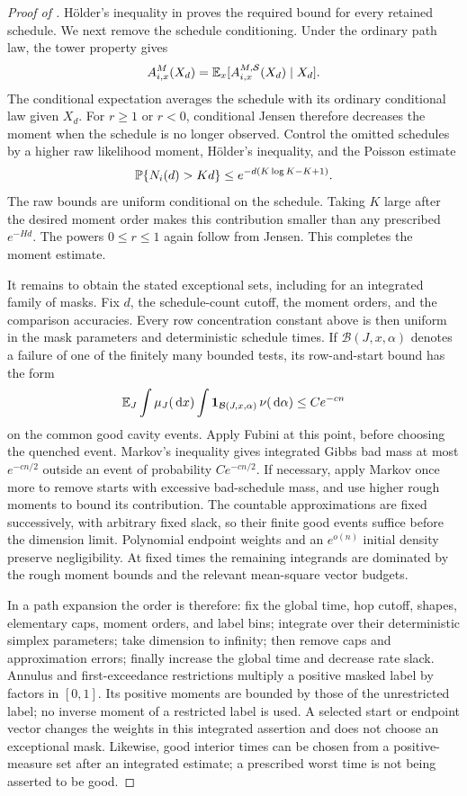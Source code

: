 \begin{proof}[Proof of ]
H\"older's inequality in  proves the required
bound for every retained schedule. We next remove the schedule
conditioning. Under the ordinary path law, the tower property gives
\[
 A_{i,x}^M(X_d)
 =\E_x[A_{i,x}^{M,\mathcal S}(X_d)\mid X_d].
\]
The conditional expectation averages the schedule with its ordinary
conditional law given $X_d$. For $r\ge1$ or $r<0$, conditional Jensen
therefore decreases the moment when the schedule is no longer observed.  Control
the omitted schedules by a higher raw likelihood moment, H\"older's
inequality, and the Poisson estimate
\[
 \P\{N_i(d)>Kd\}\le e^{-d(K\log K-K+1)}.
\]
The raw bounds are uniform conditional on the schedule.  Taking $K$
large after the desired moment order makes this contribution smaller
than any prescribed $e^{-Hd}$.  The powers $0\le r\le1$ again follow
from Jensen.  This completes the moment estimate.

It remains to obtain the stated exceptional sets, including for an
integrated family of masks.  Fix $d$, the schedule-count cutoff, the
moment orders, and the comparison accuracies.  Every row concentration
constant above is then uniform in the mask parameters and deterministic
schedule times.  If
$\mathcal B(J,x,\alpha)$ denotes a failure of one of the finitely many
bounded tests, its row-and-start bound has the form
\[
 \E_J\int\mu_J(\dd x)\int
          \1_{\mathcal B(J,x,\alpha)}\,\nu(\dd\alpha)
       \le C e^{-cn}
\]
on the common good cavity events.  Apply Fubini at this point, before choosing the quenched event.  Markov's
inequality gives integrated Gibbs bad mass at most $e^{-cn/2}$ outside
an event of probability $Ce^{-cn/2}$.  If necessary, apply Markov once
more to remove starts with excessive bad-schedule mass, and use higher
rough moments to bound its contribution.  The countable approximations are fixed successively, with
arbitrary fixed slack, so their finite good events suffice before the
dimension limit.  Polynomial endpoint weights and an $e^{o(n)}$
initial density preserve negligibility.  At fixed times the remaining
integrands are dominated by the rough moment bounds and the relevant
mean-square vector budgets.

In a path expansion the order is therefore: fix the global time, hop
cutoff, shapes, elementary caps, moment orders, and label bins; integrate
over their deterministic simplex parameters; take dimension to
infinity; then remove caps and approximation errors; finally increase
the global time and decrease rate slack.  Annulus and first-exceedance
restrictions multiply a positive masked label by factors in $[0,1]$.
Its positive moments are bounded by those of the unrestricted label;
no inverse moment of a restricted label is used.  A selected start or
endpoint vector changes the weights in this integrated assertion and
does not choose an exceptional mask.  Likewise, good interior times
can be chosen from a positive-measure set after an integrated
estimate; a prescribed worst time is not being asserted to be good.
\end{proof}

